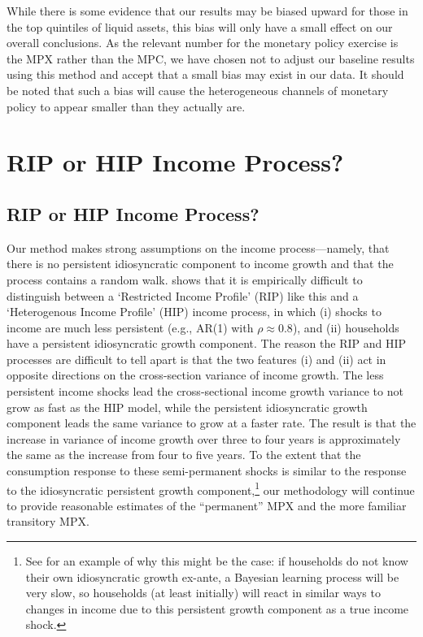\documentclass[titlepage]{\econtex}\newcommand{\texname}{ConsumptionHeterogeneity}
\begin{document}
	While there is some evidence that our results may be biased upward for those in the top quintiles of liquid assets, this bias will only have a small effect on our overall conclusions. As the relevant number for the monetary policy exercise is the MPX rather than the MPC, we have chosen not to adjust our baseline results using this method and accept that a small bias may exist in our data. It should be noted that such a bias will cause the heterogeneous channels of monetary policy to appear smaller than they actually are.
	
	
	\section{RIP or HIP Income Process?} \label{rip_hip_appendix}
	\setcounter{figure}{0}   
	\setcounter{table}{0} 
	\subsection{RIP or HIP Income Process?} \label{rip_hip}
	Our method makes strong assumptions on the income process---namely, that there is no persistent idiosyncratic component to income growth and that the process contains a random walk.  shows that it is empirically difficult to distinguish between a `Restricted Income Profile' (RIP) like this and a `Heterogenous Income Profile' (HIP) income process, in which (i) shocks to income are much less persistent (e.g., AR(1) with $\rho\approx 0.8$), and (ii) households have a persistent idiosyncratic growth component. The reason the RIP and HIP processes are difficult to tell apart is that the two features (i) and (ii) act in opposite directions on the cross-section variance of income growth. The less persistent income shocks lead the cross-sectional income growth variance to not grow as fast as the HIP model, while the persistent idiosyncratic growth component leads the same variance to grow at a faster rate. The result is that the increase in variance of income growth over three to four years is approximately the same as the increase from four to five years. To the extent that the consumption response to these semi-permanent shocks is similar to the response to the idiosyncratic persistent growth component,\footnote{See  for an example of why this might be the case: if households do not know their own idiosyncratic growth ex-ante, a Bayesian learning process will be very slow, so households (at least initially) will react in similar ways to changes in income due to this persistent growth component as a true income shock.} our methodology will continue to provide reasonable estimates of the ``permanent'' MPX and the more familiar transitory MPX. 
	
\end{document}

